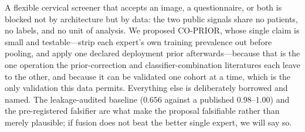 \documentclass[sigplan,nonacm,screen]{acmart}
\begin{document}
A flexible cervical screener that accepts an image, a questionnaire, or both is blocked not by architecture but by data: the two public signals share no patients, no labels, and no unit of analysis. We proposed CO-PRIOR, whose single claim is small and testable---strip each expert's own training prevalence out before pooling, and apply one declared deployment prior afterwards---because that is the one operation the prior-correction and classifier-combination literatures each leave to the other, and because it can be validated one cohort at a time, which is the only validation this data permits. Everything else is deliberately borrowed and named. The leakage-audited baseline ($0.656$ against a published $0.98$--$1.00$) and the pre-registered falsifier are what make the proposal falsifiable rather than merely plausible; if fusion does not beat the better single expert, we will say so.



\end{document}
